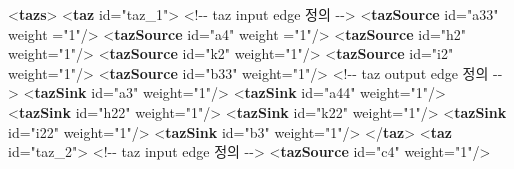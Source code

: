 \documentclass[
  letterpaper,
  DIV=11,
  numbers=noendperiod]{scrreprt}
\newenvironment{Shaded}{\begin{snugshade}}{\end{snugshade}}
\newcommand{\CommentTok}[1]{\textcolor[rgb]{0.37,0.37,0.37}{#1}}
\newcommand{\KeywordTok}[1]{\textcolor[rgb]{0.00,0.23,0.31}{\textbf{#1}}}
\newcommand{\NormalTok}[1]{\textcolor[rgb]{0.00,0.23,0.31}{#1}}
\newcommand{\OtherTok}[1]{\textcolor[rgb]{0.00,0.23,0.31}{#1}}
\newcommand{\StringTok}[1]{\textcolor[rgb]{0.13,0.47,0.30}{#1}}
\begin{document}
\begin{Shaded}
\begin{Highlighting}[]
\NormalTok{\textless{}}\KeywordTok{tazs}\NormalTok{\textgreater{}}
\NormalTok{    \textless{}}\KeywordTok{taz} \OtherTok{id=}\StringTok{"taz\_1"}\NormalTok{\textgreater{} }
    \CommentTok{\textless{}!{-}{-} taz input edge 정의 {-}{-}\textgreater{}}
\NormalTok{        \textless{}}\KeywordTok{tazSource} \OtherTok{id=}\StringTok{"a33"} \OtherTok{weight} \OtherTok{=}\StringTok{"1"}\NormalTok{/\textgreater{}}
\NormalTok{        \textless{}}\KeywordTok{tazSource} \OtherTok{id=}\StringTok{"a4"} \OtherTok{weight} \OtherTok{=}\StringTok{"1"}\NormalTok{/\textgreater{}}
\NormalTok{        \textless{}}\KeywordTok{tazSource} \OtherTok{id=}\StringTok{"h2"} \OtherTok{weight=}\StringTok{"1"}\NormalTok{/\textgreater{}}
\NormalTok{        \textless{}}\KeywordTok{tazSource} \OtherTok{id=}\StringTok{"k2"} \OtherTok{weight=}\StringTok{"1"}\NormalTok{/\textgreater{}}
\NormalTok{        \textless{}}\KeywordTok{tazSource} \OtherTok{id=}\StringTok{"i2"} \OtherTok{weight=}\StringTok{"1"}\NormalTok{/\textgreater{}}
\NormalTok{        \textless{}}\KeywordTok{tazSource} \OtherTok{id=}\StringTok{"b33"} \OtherTok{weight=}\StringTok{"1"}\NormalTok{/\textgreater{}}
    \CommentTok{\textless{}!{-}{-} taz output edge 정의 {-}{-}\textgreater{}}
\NormalTok{        \textless{}}\KeywordTok{tazSink} \OtherTok{id=}\StringTok{"a3"} \OtherTok{weight=}\StringTok{"1"}\NormalTok{/\textgreater{}}
\NormalTok{        \textless{}}\KeywordTok{tazSink} \OtherTok{id=}\StringTok{"a44"} \OtherTok{weight=}\StringTok{"1"}\NormalTok{/\textgreater{}}
\NormalTok{        \textless{}}\KeywordTok{tazSink} \OtherTok{id=}\StringTok{"h22"} \OtherTok{weight=}\StringTok{"1"}\NormalTok{/\textgreater{}}
\NormalTok{        \textless{}}\KeywordTok{tazSink} \OtherTok{id=}\StringTok{"k22"} \OtherTok{weight=}\StringTok{"1"}\NormalTok{/\textgreater{}}
\NormalTok{        \textless{}}\KeywordTok{tazSink} \OtherTok{id=}\StringTok{"i22"} \OtherTok{weight=}\StringTok{"1"}\NormalTok{/\textgreater{}}
\NormalTok{        \textless{}}\KeywordTok{tazSink} \OtherTok{id=}\StringTok{"b3"} \OtherTok{weight=}\StringTok{"1"}\NormalTok{/\textgreater{}}
\NormalTok{    \textless{}/}\KeywordTok{taz}\NormalTok{\textgreater{}}
\NormalTok{    \textless{}}\KeywordTok{taz} \OtherTok{id=}\StringTok{"taz\_2"}\NormalTok{\textgreater{}}
    \CommentTok{\textless{}!{-}{-} taz input edge 정의 {-}{-}\textgreater{}}
\NormalTok{        \textless{}}\KeywordTok{tazSource} \OtherTok{id=}\StringTok{"c4"} \OtherTok{weight=}\StringTok{"1"}\NormalTok{/\textgreater{}}

\end{Highlighting}
\end{Shaded}
\end{document}
